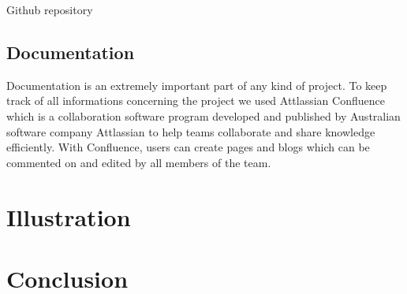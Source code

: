 \begin{itemize}
        Github repository\cite{color-transfer}

    \end{itemize}


    \subsection{Documentation}
        Documentation is an extremely important part of any kind of project. To keep track of all informations
        concerning the project we used Attlassian Confluence which is a collaboration software
        program developed and published by Australian software company Attlassian to help teams collaborate
        and share knowledge efficiently. With Confluence, users can create pages and blogs which can be
        commented on and edited by all members of the team.

\section{Illustration}


\section{Conclusion}
